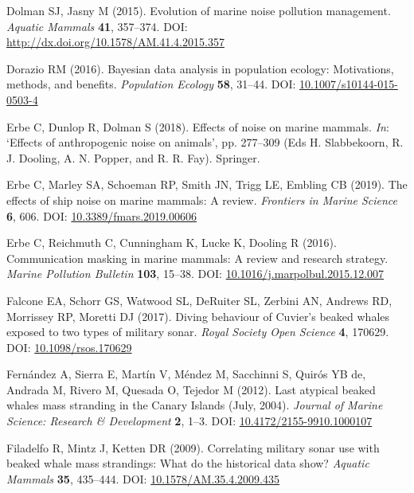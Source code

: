 \documentclass[
]{article}
\begin{document}
\leavevmode\hypertarget{ref-Dolman2015}{}%
Dolman SJ, Jasny M (2015). Evolution of marine noise pollution management. \emph{Aquatic Mammals} \textbf{41}, 357--374. DOI: \href{https://doi.org/http://dx.doi.org/10.1578/AM.41.4.2015.357}{http://dx.doi.org/10.1578/AM.41.4.2015.357}

\leavevmode\hypertarget{ref-Dorazio2016}{}%
Dorazio RM (2016). Bayesian data analysis in population ecology: Motivations, methods, and benefits. \emph{Population Ecology} \textbf{58}, 31--44. DOI: \href{https://doi.org/10.1007/s10144-015-0503-4}{10.1007/s10144-015-0503-4}

\leavevmode\hypertarget{ref-Erbe2018}{}%
Erbe C, Dunlop R, Dolman S (2018). Effects of noise on marine mammals. \emph{In}: `Effects of anthropogenic noise on animals', pp. 277--309 (Eds H. Slabbekoorn, R. J. Dooling, A. N. Popper, and R. R. Fay). Springer.

\leavevmode\hypertarget{ref-Erbe2019}{}%
Erbe C, Marley SA, Schoeman RP, Smith JN, Trigg LE, Embling CB (2019). The effects of ship noise on marine mammals: A review. \emph{Frontiers in Marine Science} \textbf{6}, 606. DOI: \href{https://doi.org/10.3389/fmars.2019.00606}{10.3389/fmars.2019.00606}

\leavevmode\hypertarget{ref-Erbe2016}{}%
Erbe C, Reichmuth C, Cunningham K, Lucke K, Dooling R (2016). Communication masking in marine mammals: A review and research strategy. \emph{Marine Pollution Bulletin} \textbf{103}, 15--38. DOI: \href{https://doi.org/10.1016/j.marpolbul.2015.12.007}{10.1016/j.marpolbul.2015.12.007}

\leavevmode\hypertarget{ref-Falcone2017}{}%
Falcone EA, Schorr GS, Watwood SL, DeRuiter SL, Zerbini AN, Andrews RD, Morrissey RP, Moretti DJ (2017). Diving behaviour of Cuvier's beaked whales exposed to two types of military sonar. \emph{Royal Society Open Science} \textbf{4}, 170629. DOI: \href{https://doi.org/10.1098/rsos.170629}{10.1098/rsos.170629}

\leavevmode\hypertarget{ref-Fernandez2012}{}%
Fernández A, Sierra E, Martín V, Méndez M, Sacchinni S, Quirós YB de, Andrada M, Rivero M, Quesada O, Tejedor M (2012). Last atypical beaked whales mass stranding in the Canary Islands (July, 2004). \emph{Journal of Marine Science: Research \& Development} \textbf{2}, 1--3. DOI: \href{https://doi.org/10.4172/2155-9910.1000107}{10.4172/2155-9910.1000107}

\leavevmode\hypertarget{ref-Filadelfo2009}{}%
Filadelfo R, Mintz J, Ketten DR (2009). Correlating military sonar use with beaked whale mass strandings: What do the historical data show? \emph{Aquatic Mammals} \textbf{35}, 435--444. DOI: \href{https://doi.org/10.1578/AM.35.4.2009.435}{10.1578/AM.35.4.2009.435}
\end{document}
